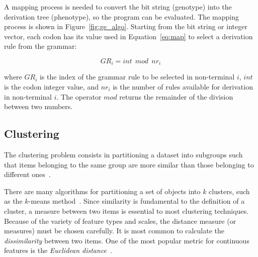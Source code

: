 \documentclass[conference]{IEEEtran}
\begin{document}
	
	A mapping process is needed to convert the bit string (genotype) into the derivation tree (phenotype), so the program can be evaluated. The mapping process is shown in Figure~\ref{fig:ge_algo}. Starting from the bit string or integer vector, each codon has its value used in Equation~\ref{eq:map} to select a derivation rule from the grammar:
	
	
	\begin{equation}\label{eq:map}
	GR_i = int~~mod~~nr_i
	\end{equation}
	
	
	where $GR_i$ is the index of the grammar rule to be selected in non-terminal $i$, $int$ is the codon integer value, and $nr_i$ is the number of rules available for derivation in non-terminal $i$. The operator $mod$ returns the remainder of the division between two numbers.
	
	\subsection{Clustering}
	
	
	The clustering problem consists in partitioning a dataset into subgroups such that items belonging to the same group are more similar than those belonging to different ones~\cite{ahalya2015data,boric2007genetic}. 
	
	
	
	
	
	There are many algorithms for partitioning a set of objects into $k$ clusters, such as the $k$-means method~\cite{kanungo2002efficient}. Since similarity is fundamental to the definition of a cluster, a measure between two items is essential to most clustering techniques. Because of the variety of feature types and scales, the distance measure (or measures) must be chosen carefully. It is most common to calculate the \textit{dissimilarity} between two items. One of the most popular metric for continuous features is the \textit{Euclidean distance}~\cite{jain1988algorithms}.
	
\end{document}
